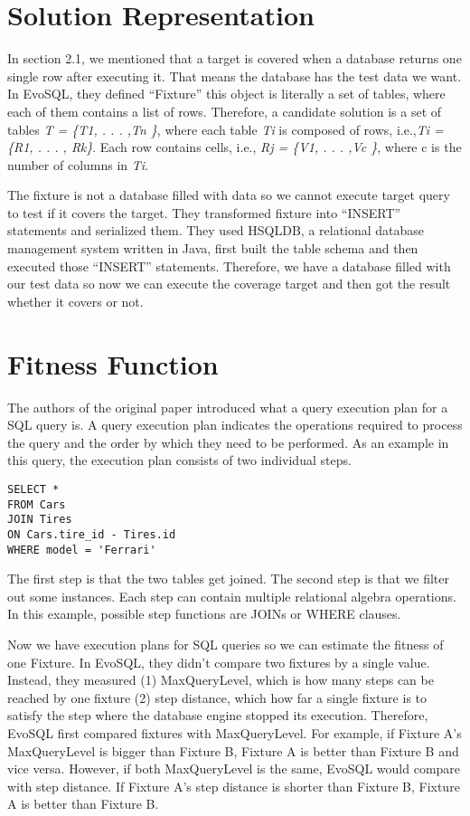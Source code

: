 \section{Solution Representation}
In section 2.1, we mentioned that a target is covered when a database returns one single row after executing it. That means the database has the test data we want. In EvoSQL, they defined “Fixture” this object is literally a set of tables, where each of them contains a list of rows. Therefore, a candidate solution is a set of tables \textit{T = \{T1, . . . ,Tn \}}, where each table \textit{Ti} is composed of rows, i.e.,\textit{Ti = \{R1, . . . , Rk\}}. Each row contains cells, i.e., \textit{Rj = \{V1, . . . ,Vc \}}, where c is the number of columns in \textit{Ti}. 

The fixture is not a database filled with data so we cannot execute target query to test if it covers the target. They transformed fixture into “INSERT” statements and serialized them. They used HSQLDB, a relational database management system written in Java, first built the table schema and then executed those “INSERT” statements. Therefore, we have a database filled with our test data so now we can execute the coverage target and then got the result whether it covers or not.

\section{Fitness Function}
The authors of the original paper introduced what a query execution plan for a SQL query is. A query execution plan indicates the operations required to process the query and the order by which they need to be performed. As an example in this query, the execution plan consists of two individual steps.
\begin{verbatim}
SELECT * 
FROM Cars
JOIN Tires
ON Cars.tire_id - Tires.id
WHERE model = 'Ferrari'
\end{verbatim}

The first step is that the two tables get joined. The second step is that we filter out some instances. Each step can contain multiple relational algebra operations. In this example, possible step functions are JOINs or WHERE clauses.

Now we have execution plans for SQL queries so we can estimate the fitness of one Fixture. In EvoSQL, they didn't compare two fixtures by a single value. Instead, they measured (1) MaxQueryLevel, which is how many steps can be reached by one fixture (2) step distance, which how far a single fixture is to satisfy the step where the database engine stopped its execution. Therefore, EvoSQL first compared fixtures with MaxQueryLevel. For example, if Fixture A's MaxQueryLevel is bigger than Fixture B, Fixture A is better than Fixture B and vice versa. However, if both MaxQueryLevel is the same, EvoSQL would compare with step distance. If Fixture A's step distance is shorter than Fixture B, Fixture A is better than Fixture B. 
